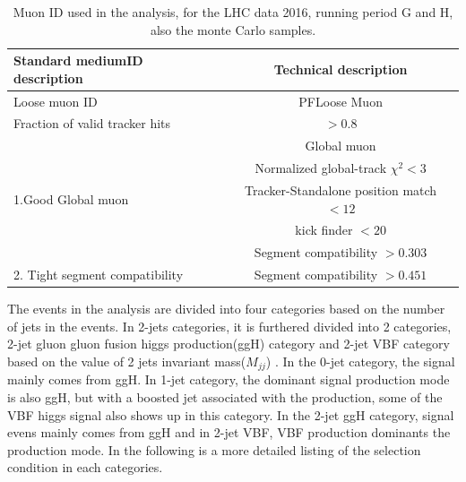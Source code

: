 \begin{table}[tpb]
\caption{Muon ID used in the analysis, for the LHC data 2016, running period G and H, also the monte Carlo samples.  \label{tbl:standardMedID}}
\label{tab:antil}
\begin{center}
\begin{tabular}{|l|c|}   
\hline
Standard mediumID description                    &  Technical description\\\hline
Loose muon ID                               & PFLoose Muon\\\hline
Fraction of valid tracker hits           & $>0.8$ \\\hline
\multirow{5}{*}{1.Good Global muon}                      &Global muon\\\cline{2-2}
                                                                        &Normalized global-track $\chi^{2}<3$\\\cline{2-2}
                                                                        &Tracker-Standalone position match $< 12$\\\cline{2-2}
                                                                        &kick finder $< 20$ \\\cline{2-2}
                                                                        &Segment compatibility $> 0.303$ \\\hline                                                                       
\hline
2. Tight segment compatibility      & Segment compatibility $>0.451$\\\hline
\end{tabular}
\end{center}
\end{table}

The events in the analysis are divided into four categories based on the number of jets in the events. In 2-jets categories, it is furthered divided into 2 categories,  2-jet gluon gluon fusion higgs production(ggH) category and 2-jet VBF category based on the value of 2 jets invariant mass($M_{jj}$) . In the 0-jet category, the signal mainly comes from ggH. In 1-jet category, the dominant signal production mode is also ggH, but with a boosted jet associated with the production, some of the VBF higgs signal also shows up in this category. In the 2-jet ggH category, signal evens mainly comes from ggH and in 2-jet VBF, VBF production dominants the production mode.  In the following is a more detailed listing of the selection condition in each categories.

